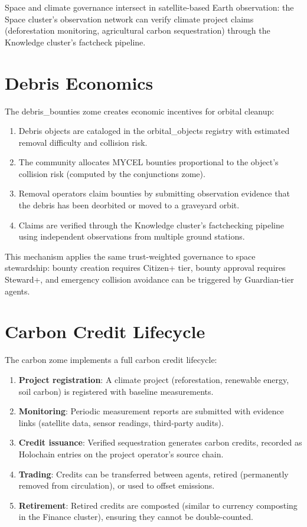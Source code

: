 \documentclass[12pt]{book}
\begin{document}
Space and climate governance intersect in satellite-based Earth observation:
the Space cluster's observation network can verify climate project claims
(deforestation monitoring, agricultural carbon sequestration) through the
Knowledge cluster's factcheck pipeline.

\section{Debris Economics}

The debris\_bounties zome creates economic incentives for orbital cleanup:

\begin{enumerate}
  \item Debris objects are cataloged in the orbital\_objects registry with
    estimated removal difficulty and collision risk.
  \item The community allocates MYCEL bounties proportional to the object's
    collision risk (computed by the conjunctions zome).
  \item Removal operators claim bounties by submitting observation evidence
    that the debris has been deorbited or moved to a graveyard orbit.
  \item Claims are verified through the Knowledge cluster's factchecking
    pipeline using independent observations from multiple ground stations.
\end{enumerate}

This mechanism applies the same trust-weighted governance to space
stewardship: bounty creation requires Citizen+ tier, bounty approval
requires Steward+, and emergency collision avoidance can be triggered
by Guardian-tier agents.

\section{Carbon Credit Lifecycle}

The carbon zome implements a full carbon credit lifecycle:

\begin{enumerate}
  \item \textbf{Project registration}: A climate project (reforestation,
    renewable energy, soil carbon) is registered with baseline measurements.
  \item \textbf{Monitoring}: Periodic measurement reports are submitted
    with evidence links (satellite data, sensor readings, third-party audits).
  \item \textbf{Credit issuance}: Verified sequestration generates carbon
    credits, recorded as Holochain entries on the project operator's source
    chain.
  \item \textbf{Trading}: Credits can be transferred between agents, retired
    (permanently removed from circulation), or used to offset emissions.
  \item \textbf{Retirement}: Retired credits are composted (similar to
    currency composting in the Finance cluster), ensuring they cannot be
    double-counted.
\end{enumerate}
\end{document}
